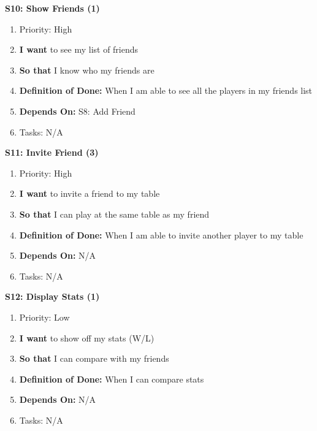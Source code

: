\textbf{S10: Show Friends (1)}
\begin{enumerate}
    \item Priority: High
    \item \textbf{I want} to see my list of friends
    \item \textbf{So that} I know who my friends are
    \item \textbf{Definition of Done:} When I am able to see all the players in my friends list
    \item \textbf{Depends On:} S8: Add Friend 
    \item Tasks: N/A
\end{enumerate}


\textbf{S11: Invite Friend (3)}
\begin{enumerate}
    \item Priority: High
    \item \textbf{I want} to invite a friend to my table
    \item \textbf{So that} I can play at the same table as my friend
    \item \textbf{Definition of Done:} When I am able to invite another player to my table
    \item \textbf{Depends On:} N/A
    \item Tasks: N/A
\end{enumerate}


\textbf{S12: Display Stats (1)}
\begin{enumerate}
    \item Priority: Low
    \item \textbf{I want} to show off my stats (W/L)
    \item \textbf{So that} I can compare with my friends
    \item \textbf{Definition of Done:} When I can compare stats
    \item \textbf{Depends On:} N/A
    \item Tasks: N/A
\end{enumerate}


